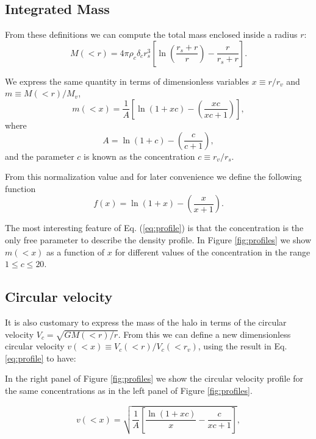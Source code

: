 \documentclass[useAMS,usenatbib]{mn2e}
\begin{document}
\subsection{Integrated Mass}
From these definitions we can compute the total mass enclosed inside a
radius $r$:
\begin{equation}
M(<r) = 4\pi\rho_c\delta_c  r_s^3\left[\ln \left
  (\frac{r_s+r}{r}\right) - \frac{r}{r_s+r}\right].
\end{equation}

We express the same quantity in terms of dimensionless
variables $x\equiv r/r_v$ and $m\equiv M(<r)/M_v$,
%
\begin{equation}
m(<x) =
\frac{1}{A}\left[\ln\left(1+xc\right)-\left(\frac{xc}{xc+1}\right)\right],
\label{eq:profile}
\end{equation}
%
where
%
\begin{equation}
A=\ln\left(1+c\right)-\left(\frac{c}{c+1}\right),
\end{equation}
%
and the parameter $c$ is known as the concentration $c\equiv r_v/r_s$.

From this normalization value and for later convenience we define the
following function
%
\begin{equation}
f(x) = \ln\left(1+x\right)-\left(\frac{x}{x+1}\right).
\label{eq:f_NFW}
\end{equation}
%

The most interesting feature of Eq. (\ref{eq:profile}) is that the
concentration is the only free parameter to describe the density
profile. In Figure \ref{fig:profiles} we show $m(<x)$ as
a function of $x$ for different values of the concentration in the range
$1\leq c \leq 20$.


\subsection{Circular velocity}

It is also customary to express the mass of the halo in terms of the
circular velocity $V_{c}=\sqrt{GM(<r)/r}$. From this we can
define a new dimensionless circular velocity $v(<x)\equiv
V_{c}(<r)/V_{c}(<r_v)$, using the result in Eq. \ref{eq:profile}
to have:


In the right panel of Figure \ref{fig:profiles} we show the circular
velocity profile for the same concentrations as in the left panel of
Figure \ref{fig:profiles}.

\begin{equation}
v(<x)=\sqrt{\frac{1}{A}\left[\frac{\ln\left(1+xc\right)}{x}-\frac{c}{xc+1}\right]},
\end{equation}
\end{document}
